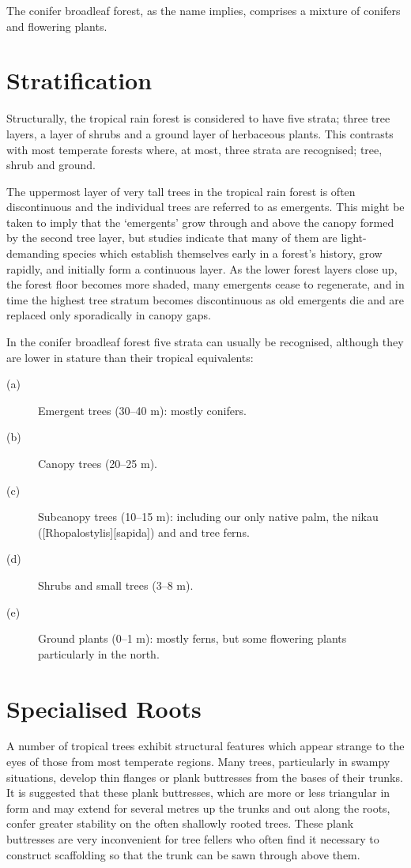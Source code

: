 The conifer broadleaf forest, as the name implies, comprises a mixture of conifers and flowering plants.

\section{Stratification}

Structurally, the tropical rain forest is considered to have five strata; three tree layers, a layer of shrubs and a ground layer of herbaceous plants.
This contrasts with most temperate forests where, at most, three strata are recognised; tree, shrub and ground.

The uppermost layer of very tall trees in the tropical rain forest is often discontinuous and the individual trees are referred to as emergents.
This might be taken to imply that the `emergents' grow through and above the canopy formed by the second tree layer, but studies indicate that many of them are light-demanding species which establish themselves early in a forest's history, grow rapidly, and initially form a continuous layer.
As the lower forest layers close up, the forest floor becomes more shaded, many emergents cease to regenerate, and in time the highest tree stratum becomes discontinuous as old emergents die and are replaced only sporadically in canopy gaps.

In the conifer broadleaf forest five strata can usually be recognised, although they are lower in stature than their tropical equivalents:
\begin{description}
\item[{(a)}]Emergent trees (30--40 m): mostly conifers.
\item[{(b)}]Canopy trees (20--25 m).
\item[{(c)}]Subcanopy trees (10--15 m): including our only native palm, the nikau ([Rhopalostylis][sapida]) and  and  tree ferns.
\item[{(d)}]Shrubs and small trees (3--8 m).
\item[{(e)}]Ground plants (0--1 m): mostly ferns, but some flowering plants particularly in the north.
\end{description}
\section{Specialised Roots}

A number of tropical trees exhibit structural features which appear strange to the eyes of those from most temperate regions.
Many trees, particularly in swampy situations, develop thin flanges or plank buttresses from the bases of their trunks.
It is suggested that these plank buttresses, which are more or less triangular in form and may extend for several metres up the trunks and out along the roots, confer greater stability on the often shallowly rooted trees.
These plank buttresses are very inconvenient for tree fellers who often find it necessary to construct scaffolding so that the trunk can be sawn through above them.

